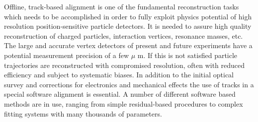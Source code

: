 Offline, track-based alignment is one of the fundamental reconstruction tasks which needs to be accomplished in order to fully exploit physics potential of high resolution position-sensitive particle detectors. It is needed to assure high quality reconstruction of charged particles, interaction vertices, resonance masses, etc. The large and accurate vertex detectors of present and future experiments have a potential measurement precision of a few $\mu$ m. If this is not satisfied particle trajectories are reconstructed with compromised resolution, often with reduced efficiency and subject to systematic biases. In addition to the initial optical survey and corrections for electronics and mechanical effects the use of tracks in a special software alignment is essential. A number of different software based methods are in use, ranging from simple residual-based procedures to complex fitting systems with many thousands of parameters.

